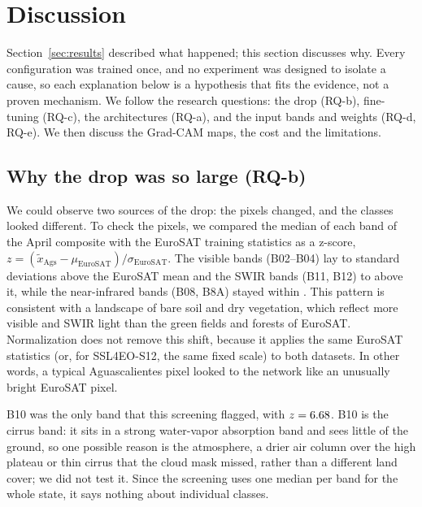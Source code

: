 \section{Discussion}\label{sec:discussion}

Section~\ref{sec:results} described what happened; this section discusses why. Every
configuration was trained once, and no experiment was designed to isolate a cause, so each
explanation below is a hypothesis that fits the evidence, not a proven mechanism. We follow the
research questions: the drop (RQ-b), fine-tuning (RQ-c), the architectures (RQ-a), and the input
bands and weights (RQ-d, RQ-e). We then discuss the Grad-CAM maps, the cost and the limitations.

\subsection{Why the drop was so large (RQ-b)}

We could observe two sources of the drop: the pixels changed, and the classes looked different.
To check the pixels, we compared the median of each band of the April composite with the EuroSAT
training statistics as a z-score, $z = (\tilde{x}_{\mathrm{Ags}} - \mu_{\mathrm{EuroSAT}}) /
\sigma_{\mathrm{EuroSAT}}$. The visible bands (B02--B04) lay \ZVisibleMin{} to \ZVisibleMax{}
standard deviations above the EuroSAT mean and the SWIR bands (B11, B12) \ZSwirMin{} to
\ZSwirMax{} above it, while the near-infrared bands (B08, B8A) stayed within \ZNirMax. This
pattern is consistent with a landscape of bare soil and dry vegetation, which reflect more
visible and SWIR light than the green fields and forests of EuroSAT. Normalization does not
remove this shift, because it applies the same EuroSAT statistics (or, for SSL4EO-S12, the same
fixed scale) to both datasets. In other words, a typical Aguascalientes pixel looked to the
network like an unusually bright EuroSAT pixel.

B10 was the only band that this screening flagged, with $z = 6.68$. B10 is the cirrus band:
it sits in a strong water-vapor absorption band and sees little of the ground, so one possible
reason is the atmosphere, a drier air column over the high plateau or thin cirrus that the cloud
mask missed, rather than a different land cover; we did not test it. Since the screening uses
one median per band for the whole state, it says nothing about individual classes.

